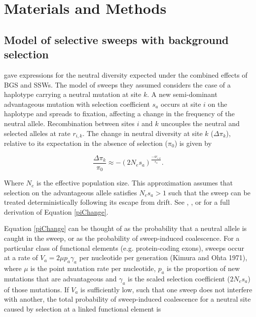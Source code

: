%
%
\section{Materials and Methods}

\subsection{Model of selective sweeps with background selection}

	\cite{RN290} gave expressions for the neutral diversity expected under the combined effects of BGS and SSWs. The model of sweeps they assumed considers the case of a haplotype carrying a neutral mutation at site $k$. A new semi-dominant advantageous mutation with selection coefficient $s_a$ occurs at site $i$ on the haplotype and spreads to fixation, affecting a change in the frequency of the neutral allele. Recombination between sites $i$ and $k$ uncouples the neutral and selected alleles at rate $r_{i,k}$. The change in neutral diversity at site $k$ ($\Delta \pi_k$), relative to its expectation in the absence of selection ($\pi_0$) is given by
	
\begin{equation}
\label{piChange}
\frac{\Delta \pi_{k}}{\pi_{0}} \approx -(2N_e s_a)^{\frac{-4r_{i,k}}{s_a}} .
\end{equation}
	
	\noindent
Where $N_e$ is the effective population size. This approximation assumes that selection on the advantageous allele satisfies $N_es_a > 1$ such that the sweep can be treated deterministically following its escape from drift. See \cite{RN235}, \cite{RN173}, or \cite{RN290} for a full derivation of Equation \ref{piChange}. 
		
	Equation \ref{piChange} can be thought of as the probability that a neutral allele is caught in the sweep, or as the probability of sweep-induced coalescence. For a particular class of functional elements (e.g. protein-coding exons), sweeps occur at a rate of $V_{a} = 2 \mu p_{a} \gamma_{a}$  per nucleotide per generation (Kimura and Ohta 1971), where $\mu$ is the point mutation rate per nucleotide, $p_a$ is the proportion of new mutations that are advantageous and $\gamma_a$ is the scaled selection coefficient ($2N_es_a$) of those mutations. If $V_a$ is sufficiently low, such that one sweep does not interfere with another, the total probability of sweep-induced coalescence for a neutral site caused by selection at a linked functional element is
	
